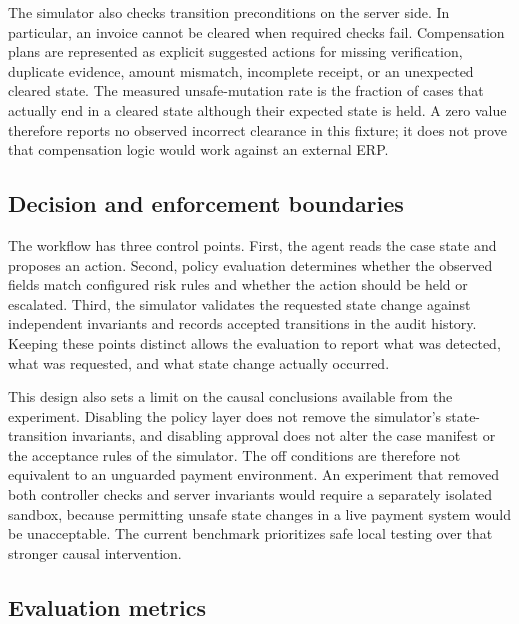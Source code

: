 \documentclass[conference]{IEEEtran}
\begin{document}
The simulator also checks transition preconditions on the server side. In particular, an invoice cannot be cleared when required checks fail. Compensation plans are represented as explicit suggested actions for missing verification, duplicate evidence, amount mismatch, incomplete receipt, or an unexpected cleared state. The measured unsafe-mutation rate is the fraction of cases that actually end in a cleared state although their expected state is held. A zero value therefore reports no observed incorrect clearance in this fixture; it does not prove that compensation logic would work against an external ERP.

\subsection{Decision and enforcement boundaries}

The workflow has three control points. First, the agent reads the case state and proposes an action. Second, policy evaluation determines whether the observed fields match configured risk rules and whether the action should be held or escalated. Third, the simulator validates the requested state change against independent invariants and records accepted transitions in the audit history. Keeping these points distinct allows the evaluation to report what was detected, what was requested, and what state change actually occurred.

This design also sets a limit on the causal conclusions available from the experiment. Disabling the policy layer does not remove the simulator's state-transition invariants, and disabling approval does not alter the case manifest or the acceptance rules of the simulator. The off conditions are therefore not equivalent to an unguarded payment environment. An experiment that removed both controller checks and server invariants would require a separately isolated sandbox, because permitting unsafe state changes in a live payment system would be unacceptable. The current benchmark prioritizes safe local testing over that stronger causal intervention.

\subsection{Evaluation metrics}
\end{document}
